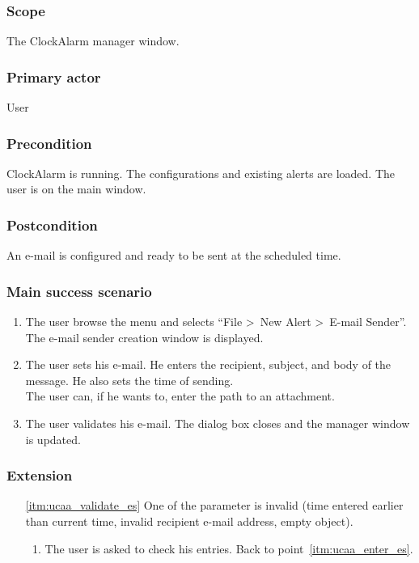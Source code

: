 \subsubsection{Scope}
The ClockAlarm manager window.
\subsubsection{Primary actor}
User
\subsubsection{Precondition}
ClockAlarm is running. The configurations and existing alerts are loaded. The user is on the main window.
\subsubsection{Postcondition}
An e-mail is configured and ready to be sent at the scheduled time.
\subsubsection{Main success scenario}
\begin{enumerate}
    \item The user browse the menu and selects ``File \textgreater~New Alert \textgreater~E-mail Sender''. The e-mail sender creation window is displayed. 
	\item\label{itm:ucaa_enter_es} The user sets his e-mail. He enters the recipient, subject, and body of the message. He also sets the time of sending. \\The user can, if he wants to, enter the path to an attachment.
	\item\label{itm:ucaa_validate_es} The user validates his e-mail. The dialog box closes and the manager window is updated.
\end{enumerate}
\subsubsection{Extension}
\begin{enumerate}
	\item[\ref{itm:ucaa_validate_es}] One of the parameter is invalid (time entered earlier than current time, invalid recipient e-mail address, empty object).
	\begin{enumerate}[i]
		\item The user is asked to check his entries. Back to point~\ref{itm:ucaa_enter_es}.
	\end{enumerate}
\end{enumerate}
